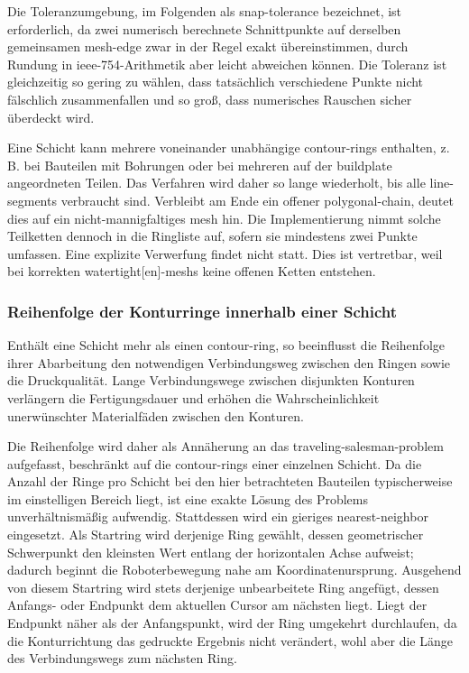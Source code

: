                 Die Toleranzumgebung, im Folgenden als \gls{snap-tolerance} bezeichnet, ist erforderlich, da zwei numerisch berechnete Schnittpunkte auf derselben gemeinsamen \gls{mesh}-\gls{edge} zwar in der Regel exakt übereinstimmen, durch Rundung in \gls{ieee-754}-Arithmetik aber leicht abweichen können.
                Die Toleranz ist gleichzeitig so gering zu wählen, dass tatsächlich verschiedene Punkte nicht fälschlich zusammenfallen und so groß, dass numerisches Rauschen sicher überdeckt wird.

                Eine Schicht kann mehrere voneinander unabhängige \glspl{contour-ring} enthalten, z.\,B. bei Bauteilen mit Bohrungen oder bei mehreren auf der \gls{buildplate} angeordneten Teilen.
                Das Verfahren wird daher so lange wiederholt, bis alle \glspl{line-segment} verbraucht sind.
                Verbleibt am Ende ein offener \gls{polygonal-chain}, deutet dies auf ein nicht-mannigfaltiges \gls{mesh} hin.
                Die Implementierung nimmt solche Teilketten dennoch in die Ringliste auf, sofern sie mindestens zwei Punkte umfassen.
                Eine explizite Verwerfung findet nicht statt.
                Dies ist vertretbar, weil bei korrekten \gls{watertight}[en]-\glspl{mesh} keine offenen Ketten entstehen.

            \subsubsection{Reihenfolge der Konturringe innerhalb einer Schicht}\label{subsubsec:concept-planar-ring-ordering}
                Enthält eine Schicht mehr als einen \gls{contour-ring}, so beeinflusst die Reihenfolge ihrer Abarbeitung den notwendigen Verbindungsweg zwischen den Ringen sowie die Druckqualität.
                Lange Verbindungswege zwischen disjunkten Konturen verlängern die Fertigungsdauer und erhöhen die Wahrscheinlichkeit unerwünschter Materialfäden zwischen den Konturen.

                Die Reihenfolge wird daher als Annäherung an das \gls{traveling-salesman-problem} aufgefasst, beschränkt auf die \glspl{contour-ring} einer einzelnen Schicht.
                Da die Anzahl der Ringe pro Schicht bei den hier betrachteten Bauteilen typischerweise im einstelligen Bereich liegt, ist eine exakte Lösung des Problems unverhältnismäßig aufwendig.
                Stattdessen wird ein gieriges \gls{nearest-neighbor} eingesetzt.
                Als Startring wird derjenige Ring gewählt, dessen geometrischer Schwerpunkt den kleinsten Wert entlang der horizontalen Achse aufweist; dadurch beginnt die Roboterbewegung nahe am Koordinatenursprung.
                Ausgehend von diesem Startring wird stets derjenige unbearbeitete Ring angefügt, dessen Anfangs- oder Endpunkt dem aktuellen Cursor am nächsten liegt.
                Liegt der Endpunkt näher als der Anfangspunkt, wird der Ring umgekehrt durchlaufen, da die Konturrichtung das gedruckte Ergebnis nicht verändert, wohl aber die Länge des Verbindungswegs zum nächsten Ring.

